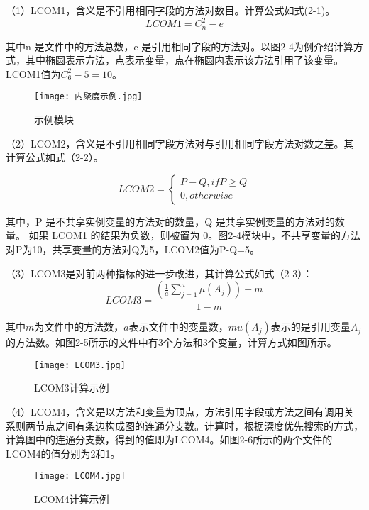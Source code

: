 （1）LCOM1，含义是不引用相同字段的方法对数目\cite{1994Ametr}。计算公式如式(2-1)。
\begin{equation}
LCOM1 = C_{n}^{2}-e
\end{equation}

其中n 是文件中的方法总数，e 是引用相同字段的方法对。以图2-4为例介绍计算方式，其中椭圆表示方法，点表示变量，点在椭圆内表示该方法引用了该变量。LCOM1值为\(C_{6}^{2} - 5 = 10\)。

\begin{figure}[h]
\centering
\texttt{[image: 内聚度示例.jpg]}
\caption{示例模块}
\end{figure}
    

（2）LCOM2，含义是不引用相同字段方法对与引用相同字段方法对数之差\cite{1996Coupling}。其计算公式如式（2-2）。

\begin{equation}
    {LCOM2}=\left\{
        \begin{array}
        {c}P-Q,  ifP\geq Q \\
        0,  otherwise
        \end{array}\right.
\end{equation}

其中，P 是不共享实例变量的方法对的数量，Q 是共享实例变量的方法对的数量。
如果 LCOM1 的结果为负数，则被置为 0。图2-4模块中，不共享变量的方法对P为10，共享变量的方法对Q为5，LCOM2值为P-Q=5。

（3）LCOM3是对前两种指标的进一步改进，其计算公式如式（2-3）：
\begin{equation}
LCOM3 = \frac{\left( \frac{1}{a} \sum_{j=1}^a \mu(A_j) \right) - m}{1 - m}
\end{equation}

其中\( m\)为文件中的方法数，\( a\)表示文件中的变量数，\( mu(A_j)\)表示的是引用变量\(A_j\)的方法数。如图2-5所示的文件中有3个方法和3个变量，计算方式如图所示。
\begin{figure}[h]
\centering
\texttt{[image: LCOM3.jpg]}
\caption{LCOM3计算示例}
\end{figure}



（4）LCOM4，含义是以方法和变量为顶点，方法引用字段或方法之间有调用关系则两节点之间有条边构成图的连通分支数\cite{1995Measuring}。计算时，根据深度优先搜索的方式，计算图中的连通分支数，得到的值即为LCOM4。如图2-6所示的两个文件的LCOM4的值分别为2和1。

\begin{figure}[h]
\centering
\texttt{[image: LCOM4.jpg]}
\caption{LCOM4计算示例}
\end{figure}

